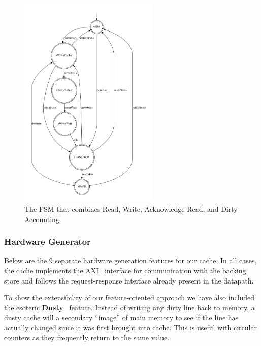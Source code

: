 \documentclass[conference]{IEEEtran}
\begin{document}
\begin{figure}[ht]
    \centering
    \includegraphics[width=0.6\textwidth]{isca2023-latex-template/figures/writeBackFSM.pdf}
    \caption{The FSM that combines Read, Write, Acknowledge Read, and Dirty Accounting.}
    \label{fig:writeBackFSM}
\end{figure}

\subsubsection{Hardware Generator}\label{sec:hwFeatures}
Below are the 9 separate hardware generation features for our cache. In all cases, the cache implements the AXI~\cite{AXI} interface for communication with the backing store and follows the request-response interface already present in the \Riscvmini{} datapath.

To show the extensibility of our feature-oriented approach we have also included the esoteric \textbf{Dusty}~\cite{Krishna:06, Friedman:05} feature. Instead of writing any dirty line back to memory, a dusty cache will a secondary ``image'' of main memory to see if the line has actually changed since it was first brought into cache. This is useful with circular counters as they frequently return to the same value.
\end{document}

